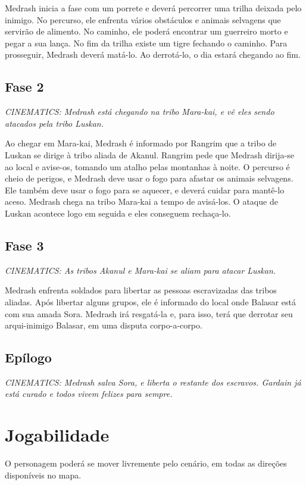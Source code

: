 \documentclass[letterpaper,11pt]{article}
\begin{document}
Medrash inicia a fase com um porrete e deverá percorrer uma trilha deixada pelo inimigo. No percurso, ele enfrenta vários obstáculos e animais selvagens que servirão de alimento.
No caminho, ele poderá encontrar um guerreiro morto e pegar a sua lança. No fim da trilha existe um tigre fechando o caminho. Para prosseguir, Medrash deverá matá-lo. Ao derrotá-lo, o dia estará chegando ao fim.

  \subsection{Fase 2}
{\it CINEMATICS: Medrash está chegando na tribo Mara-kai, e vê eles sendo atacados pela tribo Luskan.}

Ao chegar em Mara-kai, Medrash é informado por Rangrim que a tribo de Luskan se dirige à tribo aliada de Akanul. Rangrim pede que Medrash dirija-se ao local e avise-os, tomando um atalho pelas montanhas à noite. O percurso é cheio de perigos, e Medrash deve usar o fogo para afastar os animais selvagens. Ele também deve usar o fogo para se aquecer, e deverá cuidar para mantê-lo aceso.
Medrash chega na tribo Mara-kai a tempo de avisá-los. O ataque de Luskan acontece logo em seguida e eles conseguem rechaça-lo.

  \subsection{Fase 3} 
{\it CINEMATICS: As tribos Akanul e Mara-kai se aliam para atacar Luskan.}

Medrash enfrenta soldados para libertar as pessoas escravizadas das tribos aliadas. Após libertar alguns grupos, ele é informado do local onde Balasar está com sua amada Sora. Medrash irá resgatá-la e, para isso, terá que derrotar seu arqui-inimigo Balasar, em uma disputa corpo-a-corpo.

 \subsection{Epílogo}
 {\it CINEMATICS: Medrash salva Sora, e liberta o restante dos escravos. Gardain já está curado e todos vivem felizes para sempre.}

\section{Jogabilidade}
O personagem poderá se mover livremente pelo cenário, em todas as direções disponíveis no mapa.
\end{document}
